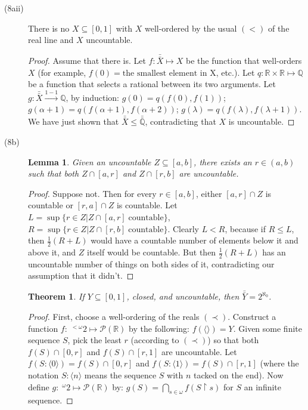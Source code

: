 \documentclass[12pt]{article}
\newcommand{\card}[1]{\bar{\bar{#1}}}
\newcommand{\power}[1]{\mathcal{P}(#1)}
\newcommand{\functionsof}[2]{\;^{#1}\!#2}
\newtheorem*{lemma*}{Lemma}
\newtheorem*{theorem*}{Theorem}
\begin{document}
\begin{description}
\item[(8aii)]
  There is no $X \subseteq [0,1]$ with $X$ well-ordered by the usual
  $(<)$ of the real line and $X$ uncountable.
  \begin{proof}
	Assume that there is.  Let $f: \card{X} \mapsto X$ be the function
	that well-orders $X$ (for example, $f(0) = \text{the smallest
	element in X}$, etc.).  Let $q: \mathbb{R} \times \mathbb{R} \mapsto
	\mathbb{Q}$ be a function that selects a rational between its two
	arguments.  Let $g: \card{X} \xrightarrow{1-1}
	\mathbb{Q}$, by induction: $g(0) = q(f(0), f(1))$; $g(\alpha+1) =
	q(f(\alpha+1), f(\alpha+2))$; $g(\lambda) = q(f(\lambda),
	f(\lambda+1))$.  We have just shown that $\card{X} \le
	\card{\mathbb{Q}}$, contradicting that $X$ is uncountable.
  \end{proof}

\item[(8b)]
  \begin{lemma*}
	Given an uncountable $Z \subseteq [a,b]$, there exists an $r \in
	(a,b)$ such that both $Z \cap [a,r]$ and $Z \cap [r,b]$ are
	uncountable.
  \end{lemma*}
  \begin{proof}
	Suppose not.  Then for every $r \in [a,b]$, either $[a,r] \cap Z$ is
	countable or $[r,a] \cap Z$ is countable.  Let $L = \sup{\{ r \in Z
	| Z \cap [a,r]\; \text{countable} \}}$, $R = \sup{\{ r \in Z | Z
	\cap [r,b]\; \text{countable} \}}$.  Clearly $L < R$, because if
	$R \le L$, then $\frac{1}{2}(R + L)$ would have a countable number of
	elements below it and above it, and $Z$ itself would be countable.
	But then $\frac{1}{2}(R + L)$ has an uncountable number of things on
	both sides of it, contradicting our assumption that it didn't.
  \end{proof}
  \begin{theorem*}
    If $Y \subseteq [0,1]$, closed, and uncountable, then $\card{Y} =
    2^{\aleph_0}$.
  \end{theorem*}
  \begin{proof}
	First, choose a well-ordering of the reals $(\prec)$.  Construct a
	function $f: \functionsof{<\omega}{2} \mapsto \power{\mathbb{R}}$ by
	the following: $f(\langle\rangle) = Y$.  Given some finite sequence
	$S$, pick the least $r$ (according to $(\prec)$) so that both $f(S)
	\cap [0,r]$ and $f(S) \cap [r,1]$ are uncountable.  Let $f(S :
	\langle 0 \rangle) = f(S) \cap [0,r]$ and $f(S : \langle 1 \rangle)
	= f(S) \cap [r,1]$ (where the notation $S : \langle n \rangle$ means
	the sequence $S$ with $n$ tacked on the end).  Now define $g:
	\functionsof{\omega}{2} \mapsto \power{\mathbb{R}}$ by: $g(S) =
	\bigcap\limits_{s \in \omega}{f(S \upharpoonright s)}$ for $S$ an
	infinite sequence.


\end{proof}
\end{description}
\end{document}
